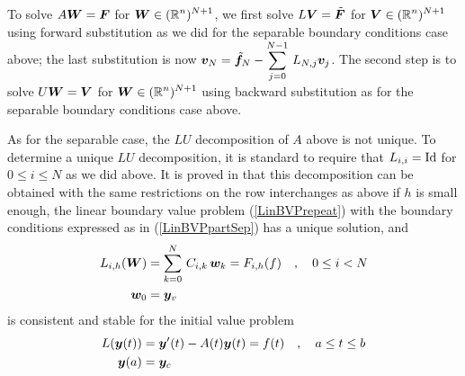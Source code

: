 To solve $A \bm{W} = \bm{F}$ for
$\displaystyle \bm{W} \in (\mathbb{R}^n)^{N+1}$, we first solve
$L\bm{V} = \tilde{\bm{F}}$ for
$\displaystyle \bm{V} \in (\mathbb{R}^n)^{N+1}$ using forward
substitution as we did for the separable boundary conditions case
above; the last substitution is now
$\displaystyle \bm{v}_N = \tilde{\bm{f}}_N
-\sum_{j=0}^{N-1}\, L_{N,j} \bm{v}_j$.
The second step is to solve $U\bm{W} =\bm{V}$ for
$\displaystyle \bm{W} \in (\mathbb{R}^n)^{N+1}$
using backward substitution as for the separable boundary conditions
case above.

As for the separable case, the $LU$ decomposition of $A$ above is not
unique.  To determine a unique $LU$ decomposition, it is standard to
require that $L_{i,i} = \operatorname{Id}$ for $0\leq i \leq N$ as we did above.
It is proved in \cite{K} that this decomposition can be obtained with the same
restrictions on the row interchanges as above if $h$ is small enough,
the linear boundary value problem (\ref{LinBVPrepeat}) with the
boundary conditions expressed as in (\ref{LinBVPpartSep}) has a unique
solution, and
\begin{align*}
L_{i,h}(\bm{W}) &= \sum_{k=0}^N\,C_{i,k}\,\bm{w}_k =
F_{i,h}(f) \quad , \quad 0 \leq i < N \\
\bm{w}_0 &= \bm{y}_v
\end{align*}
is consistent and stable for the initial value problem
\begin{align*}
L(\bm{y}(t)) &= \bm{y}'(t) - A(t)\bm{y}(t) = f(t) \quad , \quad
a \leq t \leq b \\
\bm{y}(a) &= \bm{y}_c
\end{align*}

